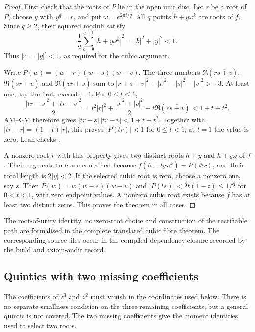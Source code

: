 \documentclass[11pt]{article}
\begin{document}
\begin{proof}
First check that the roots of $P$ lie in the open unit disc. Let $r$
be a root of $P$, choose $y$ with $y^q=r$, and put $\omega=e^{2\pi i/q}$.
All $q$ points $h+y\omega^k$ are roots of $f$. Since $q\ge2$, their squared moduli satisfy
\[
 \frac1q\sum_{k=0}^{q-1}|h+y\omega^k|^2=|h|^2+|y|^2<1.
\]
Thus $|r|=|y|^q<1$, as required for the cubic argument.

Write $P(w)=(w-r)(w-s)(w-v)$. The three numbers
$\Re(r\overline{s+v})$, $\Re(s\overline{r+v})$ and
$\Re(v\overline{r+s})$ sum to
$|r+s+v|^2-|r|^2-|s|^2-|v|^2>-3$.
At least one, say the first, exceeds $-1$. For $0\le t\le1$,
\[
 \frac{|tr-s|^2+|tr-v|^2}{2}
 =t^2|r|^2+\frac{|s|^2+|v|^2}{2}
   -t\Re(r\overline{s+v})<1+t+t^2.
\]
AM--GM therefore gives $|tr-s|\,|tr-v|<1+t+t^2$. Together with
$|tr-r|=(1-t)|r|$, this proves $|P(tr)|<1$ for $0\le t<1$;
at $t=1$ the value is zero. Lean checks
.

A nonzero root $r$ with this property gives two distinct roots
$h+y$ and $h+y\omega$ of $f$. Their segments to $h$ are contained because
$f(h+ty\omega^k)=P(t^qr)$, and their total length is $2|y|<2$.
If the selected cubic root is zero, choose a nonzero one, say $s$.
Then $P(w)=w(w-s)(w-v)$ and
$|P(ts)|<2t(1-t)\le1/2$ for $0<t<1$, with zero endpoint values.
A nonzero cubic root exists because $f$ has at least two distinct zeros.
This proves the theorem in all cases.
\end{proof}

The root-of-unity identity, nonzero-root choice and construction of the
rectifiable path are formalised in
\href{https://github.com/wcook04/plectis-erdos/blob/27c2fc5fe3c55fe547feaeb4c9bb68b3cf63a5bf/lean/ErdosProblems/Erdos1041/PaperCubicFibres.lean#L240}{the complete translated cubic fibre theorem}.
The corresponding source files occur in the compiled dependency closure
recorded by
\href{https://github.com/wcook04/plectis-erdos/blob/27c2fc5fe3c55fe547feaeb4c9bb68b3cf63a5bf/verification/erdos1041-returned-r18-v5-full-audit-evidence.json}{the build and axiom-audit record}.

\subsection{Quintics with two missing coefficients}

The coefficients of $z^3$ and $z^2$ must vanish in the coordinates used
below. There is no separate smallness condition on the three remaining
coefficients, but a general quintic is not covered. The two missing
coefficients give the moment identities used to select two roots.
\end{document}
